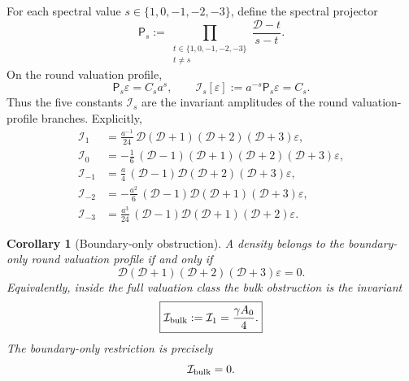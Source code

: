 \documentclass[11pt,a4paper]{article}
\numberwithin{equation}{section}
\newtheorem{corollary}[criterion]{Corollary}
\theoremstyle{remark}
\newcommand{\Dil}{\mathscr{D}}
\begin{document}
For each spectral value \(s\in\{1,0,-1,-2,-3\}\), define the spectral projector
\begin{equation}
\mathsf{P}_s
:=
\prod_{\substack{t\in\{1,0,-1,-2,-3\}\\ t\ne s}}
\frac{\Dil-t}{s-t}.
\end{equation}
On the round valuation profile,
\begin{equation}
\mathsf{P}_s\varepsilon=C_s a^s,
\qquad
\boxed{
\mathcal{I}_s[\varepsilon]:=a^{-s}\mathsf{P}_s\varepsilon=C_s .
}
\end{equation}
Thus the five constants \(\mathcal I_s\) are the invariant amplitudes of the round valuation-profile branches. Explicitly,
\begin{align}
\mathcal{I}_1
&=
\frac{a^{-1}}{24}\,
\Dil(\Dil+1)(\Dil+2)(\Dil+3)\varepsilon,
\\
\mathcal{I}_0
&=
-\frac{1}{6}\,
(\Dil-1)(\Dil+1)(\Dil+2)(\Dil+3)\varepsilon,
\\
\mathcal{I}_{-1}
&=
\frac{a}{4}\,
(\Dil-1)\Dil(\Dil+2)(\Dil+3)\varepsilon,
\\
\mathcal{I}_{-2}
&=
-\frac{a^2}{6}\,
(\Dil-1)\Dil(\Dil+1)(\Dil+3)\varepsilon,
\\
\mathcal{I}_{-3}
&=
\frac{a^3}{24}\,
(\Dil-1)\Dil(\Dil+1)(\Dil+2)\varepsilon.
\end{align}

\begin{corollary}[Boundary-only obstruction]
A density belongs to the boundary-only round valuation profile if and only if
\begin{equation}
\boxed{
\Dil(\Dil+1)(\Dil+2)(\Dil+3)\varepsilon=0 .
}
\end{equation}
Equivalently, inside the full valuation class the bulk obstruction is the invariant
\begin{equation}
\boxed{
\mathcal{I}_{\rm bulk}:=\mathcal{I}_1=\frac{\gamma A_0}{4}.
}
\end{equation}
The boundary-only restriction is precisely
\begin{equation}
\mathcal{I}_{\rm bulk}=0.
\end{equation}
\end{corollary}
\end{document}
